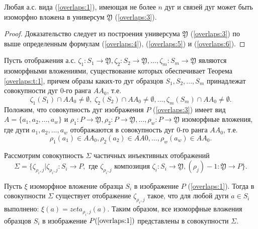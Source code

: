 \begin{theorem}
Любая а.с. вида (\ref{overlaps:1}), имеющая не более $n$ дуг и связей дуг может быть изоморфно вложена в универсум  $\mathfrak{Y}$  (\ref{overlaps:3}).
\label{overlaps:t:1}
\end{theorem}
\begin{proof}
Доказательство следует из построения универсума $\mathfrak{Y}$  (\ref{overlaps:3}) по выше определенным формулам (\ref{overlaps:4}), (\ref{overlaps:5}) и  (\ref{overlaps:6}).
\end{proof} 

Пусть отображения а.с.  $\zeta_1 : S_1\to \mathfrak{Y} , \zeta_2: S_2 \to \mathfrak{Y} , ..., \zeta_m: S_m \to \mathfrak{Y}$  являются изоморфными вложениями, существование которых обеспечивает Теорема \ref{overlaps:t:1}, причем образы каких-то дуг образцов $S_1,  S_2 , ..., S_m$ принадлежат   совокупности дуг 0-го ранга $AA_0$, т.е. 
\begin{equation}
\zeta_1 (S_1) \cap  AA_0  \neq \emptyset,\;\zeta_2 (S_2) \cap  AA_0 \neq \emptyset, ..., \zeta_m(S_m) \cap  AA_0 \neq \emptyset.
\label{overlaps:7}
\end{equation}
Положим, что совокупность дуг изображения $P$ (\ref{overlaps:3}) имеет вид
$A = \{a_1, a_2, ..., a_w\}$ и $\rho_1 : P \to \mathfrak{Y} , \rho_2: P \to \mathfrak{Y}, ..., \rho_w: P \to \mathfrak{Y}$  изоморфные вложения, где дуги  $a_1, a_2, ..., a_w$ отображаются в совокупность дуг 0-го ранга $AA_0$, т.е. 
\begin{equation}
\rho_1(a_1) \in AA_0, \rho_2(a_2) \in AA0, ..., \rho_w (a_w) \in AA_0.
\label{overlaps:8}
\end{equation}

Рассмотрим совокупность $\Sigma$ частичных инъективных отображений  
\begin{equation}
\Sigma = \{ \zeta_{\rho_i,j} | \zeta_{\rho_i,j} : S_i \to P,\text{ где } \zeta_{\rho_i,j} \text{ композиция } \zeta_i : S_i \to \mathfrak{Y} , (\rho_j)-1 : \mathfrak{Y} \to P \}.
\label{overlaps:9}
\end{equation}

\begin{theorem}
Пусть  $\xi$  изоморфное вложение образца  $S_i$  в изображение  $P$  (\ref{overlaps:1}). Тогда в совокупности  $\Sigma$  существует отображение  $\zeta_{\rho_i,j}$  такое, что для любой дуги $a \in S_i$ выполнено: $\xi(a) = zeta_{\rho_i,j}(a)$. Таким образом, все изоморфные  вложения образцов  $S_i$  в изображение  $P (\ref{overlaps:1})$ представлены в совокупности $\Sigma$.
\label{overlaps:t:2}
\end{theorem}

